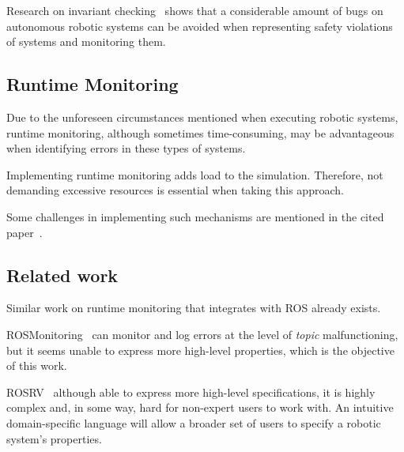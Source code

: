 Research on invariant checking~\cite{zizyte2021importance} shows that a considerable amount of bugs on autonomous robotic systems can be avoided when representing safety violations of systems and monitoring them.

\subsection{Runtime Monitoring}

Due to the unforeseen circumstances mentioned when executing robotic systems, runtime monitoring, although sometimes time-consuming, may be advantageous when identifying errors in these types of systems.

Implementing runtime monitoring adds load to the simulation. Therefore, not demanding excessive resources is essential when taking this approach.

Some challenges in implementing such mechanisms are mentioned in the cited paper~\cite{stadler2022towards}.

\subsection{Related work}

Similar work on runtime monitoring that integrates with ROS already exists. 

ROSMonitoring~\cite{ferrando2020rosmonitoring} can monitor and log errors at the level of \textit{topic} malfunctioning, but it seems unable to express more high-level properties, which is the objective of this work. 

ROSRV~\cite{huang2014rosrv} although able to express more high-level specifications, it is highly complex and, in some way, hard for non-expert users to work with. An intuitive domain-specific language will allow a broader set of users to specify a robotic system's properties. 

